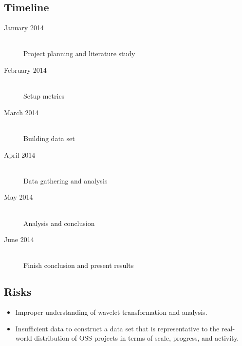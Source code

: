 \subsection{Timeline}
\begin{description}
	\item[January 2014] \hfill \\ Project planning and literature study
	\item[February 2014] \hfill \\ Setup metrics
	\item[March 2014] \hfill \\ Building data set
	\item[April 2014] \hfill \\ Data gathering and analysis
	\item[May 2014] \hfill \\ Analysis and conclusion
	\item[June 2014] \hfill \\ Finish conclusion and present results
\end{description}

\subsection{Risks}
\begin{itemize}
	\item Improper understanding of wavelet transformation and analysis.
	\item Insufficient data to construct a data set that is representative to the
	real-world distribution of OSS projects in terms of scale, progress, and
	activity.
\end{itemize}
